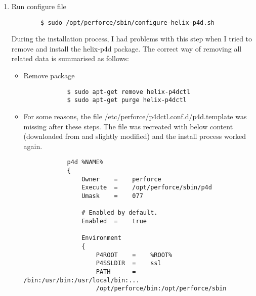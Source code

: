 \begin{enumerate}
\begin{verbatim}
    \end{verbatim}
    \item Run configure file
    \begin{verbatim}
        $ sudo /opt/perforce/sbin/configure-helix-p4d.sh
    \end{verbatim}
    During the installation process, I had problems with this step when I tried to remove and install the helix-p4d
    package. The correct way of removing all related data is summarised as follows:
    \begin{itemize}
        \item Remove package
        \begin{verbatim}
            $ sudo apt-get remove helix-p4dctl
            $ sudo apt-get purge helix-p4dctl
        \end{verbatim}
        \item For some reasons, the file \colorbox{blue!30}{/etc/perforce/p4dctl.conf.d/p4d.template} was missing after
        these steps. The file was recreated with below content (downloaded from \href{https://portal.perforce.com/s/article/15056}{\color{blue}{here}} 
        and slightly modified) and the install process worked again.
        \begin{verbatim}
            p4d %NAME%
            {
                Owner    =    perforce
                Execute  =    /opt/perforce/sbin/p4d
                Umask    =    077

                # Enabled by default.
                Enabled  =    true

                Environment
                {
                    P4ROOT    =    %ROOT%
                    P4SSLDIR  =    ssl
                    PATH      =    /bin:/usr/bin:/usr/local/bin:...
                    /opt/perforce/bin:/opt/perforce/sbin


\end{verbatim}
\end{itemize}
\end{enumerate}
